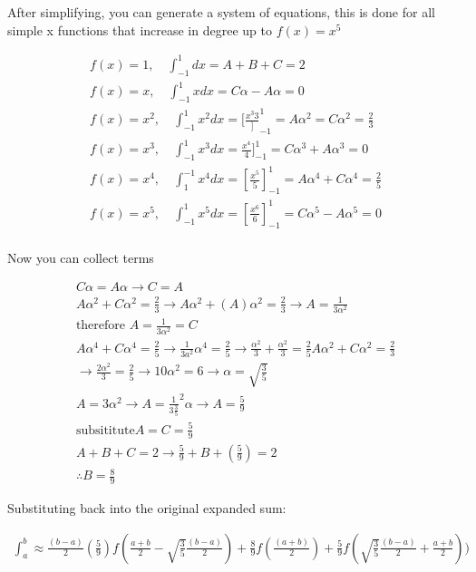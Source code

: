 \documentclass{article}
\begin{document}
After simplifying, you can generate a system of equations, this is done for all simple x functions that increase in degree up to $f(x) = x^{5}$

\begin{gather*}
  f(x) = 1, \quad \int_{-1}^{1}dx = A + B + C = 2 \\
  f(x) = x, \quad \int_{-1}^{1}xdx = C \alpha - A \alpha = 0 \\
  f(x) = x^{2}, \quad \int_{-1}^{1}x^{2}dx =  [\frac{x^{3}{3}}]^{1}_{-1} = A\alpha^{2} = C\alpha^{2} = \frac{2}{3}\\
  f(x) = x^{3}, \quad \int_{-1}^{1}x^{3}dx =  \frac{x^{4}}{4}]^{1}_{-1} = C\alpha^{3} + A\alpha^{3} = 0\\
  f(x) = x^{4},\quad \int_{1}^{-1}x^{4}dx = [\frac{x^{5}}{5}]^{1}_{-1} = A\alpha^{4} + C\alpha^{4} = \frac{2}{5}\\
  f(x) = x^{5}, \quad \int^{1}_{-1}x^{5}dx = [\frac{x^{6}}{6}]^{1}_{-1} = C\alpha^{5} - A\alpha^{5} = 0\\
\end{gather*}

Now you can collect terms

\begin{gather*}
    C\alpha = A\alpha \rightarrow C = A\\
    A\alpha^{2}  + C\alpha^{2} = \frac{2}{3} \rightarrow A\alpha^{2} + (A)\alpha^{2} = \frac{2}{3} \rightarrow A = \frac{1}{3\alpha^{2}}\\
    \text{therefore } A  = \frac{1}{3\alpha^{2}} = C\\
    A\alpha^{4} + C\alpha^{4}= \frac{2}{5} \rightarrow \frac{1}{3a^{2}}\alpha^{4} = \frac{2}{5} \rightarrow \frac{\alpha^{2}}{3} + \frac{\alpha^{2}}{3} = \frac{2}{5}
    A\alpha^{2} + C\alpha^{2} = \frac{2}{3}\\
    \rightarrow \frac{2\alpha^{2}}{3} = \frac{ 2}{5} \rightarrow 10 \alpha^{2} = 6 \rightarrow \alpha = \sqrt{\frac{3}{5}} \\
    A = 3\alpha^{2} \rightarrow A = \frac{1}{3\frac{3}{5}}^{2} \alpha \rightarrow A = \frac{5}{9}\\
    \text{subsititute}
    A = C = \frac{5}{9}\\
    A + B + C = 2 \rightarrow \frac{5}{9} + B + (\frac{5}{9}) = 2 \\ \therefore B = \frac{8}{9}
\end{gather*}

Substituting back into the original expanded sum:

\begin{gather*}
  \int_{a}^{b} \approx \frac{(b-a)}{2} (\frac{5}{9}) f(\frac{a+b}{2} - \sqrt{\frac{3}{5}} \frac{(b-a)}{2}) + \frac{8}{9}f(\frac{(a+b)}{2}) + \frac{5}{9} f(\sqrt{\frac{3}{5}}\frac{(b-a)}{2} + \frac{a+b}{2}))
\end{gather*}
\end{document}
